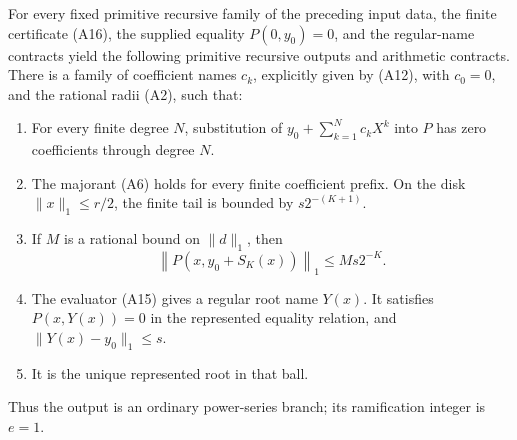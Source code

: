 \begin{theorem}
\label{thm:simple-branch}
For every fixed primitive recursive family of the preceding input data,
the finite certificate (A16), the supplied equality \(P(0,y_0)=0\), and
the regular-name contracts yield the following primitive recursive
outputs and arithmetic contracts.
There is a family of coefficient names \(c_k\), explicitly given by
(A12), with \(c_0=0\), and the rational radii (A2), such that:
\begin{enumerate}
\item For every finite degree \(N\), substitution of
      \(y_0+\sum_{k=1}^{N}c_kX^k\) into \(P\) has zero coefficients
      through degree \(N\).
\item The majorant (A6) holds for every finite coefficient prefix.
      On the disk \(\lVert x\rVert_1\leq r/2\), the finite tail is
      bounded by \(s2^{-(K+1)}\).
\item If \(M\) is a rational bound on \(\lVert d\rVert_1\), then
      \[
       \left\lVert P\left(x,y_0+S_K(x)\right)\right\rVert_1
          \leq Ms2^{-K}.
       \tag{A19}\label{eq:original-residual}
      \]
\item The evaluator (A15) gives a regular root name \(Y(x)\).
      It satisfies \(P(x,Y(x))=0\) in the represented equality
      relation, and \(\lVert Y(x)-y_0\rVert_1\leq s\).
\item It is the unique represented root in that ball.
\end{enumerate}
Thus the output is an ordinary power-series branch; its ramification
integer is \(e=1\).
\end{theorem}
